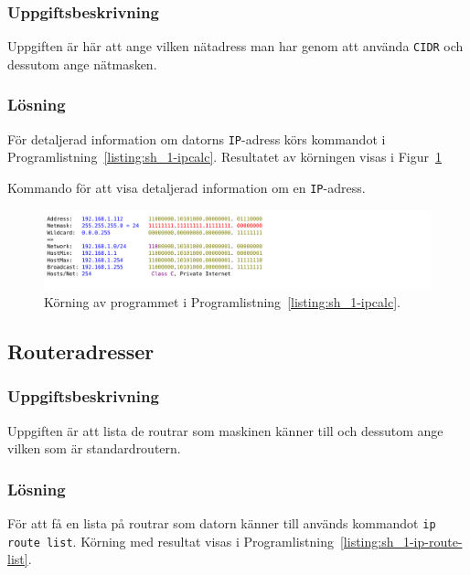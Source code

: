 \subsubsection{Uppgiftsbeskrivning}
Uppgiften är här att ange vilken nätadress man har genom att använda
\texttt{CIDR} och dessutom ange nätmasken.


\subsubsection{Lösning}
För detaljerad information om datorns \texttt{IP}-adress körs kommandot i
Programlistning~\ref{listing:sh_1-ipcalc}. Resultatet av körningen visas i
Figur~\ref{fig:sh_1-ipcalc_output}

\begin{listing}[H]
  \caption{Kommando för att visa detaljerad information om en
           \texttt{IP}-adress.}
  \label{listing:sh_1-ipcalc}
\end{listing}

\begin{figure}[htp]
  \centering
  \includegraphics[scale=0.85]{include/sh_1-ipcalc_output.pdf}
  \caption{Körning av programmet i Programlistning~\ref{listing:sh_1-ipcalc}.}
  \label{fig:sh_1-ipcalc_output}
\end{figure}



\subsection{Routeradresser}
\subsubsection{Uppgiftsbeskrivning}
Uppgiften är att lista de routrar som maskinen känner till och dessutom ange
vilken som är standardroutern.

\subsubsection{Lösning}
För att få en lista på routrar som datorn känner till används kommandot \texttt{ip route list}.
Körning med resultat visas i Programlistning~\ref{listing:sh_1-ip-route-list}.

